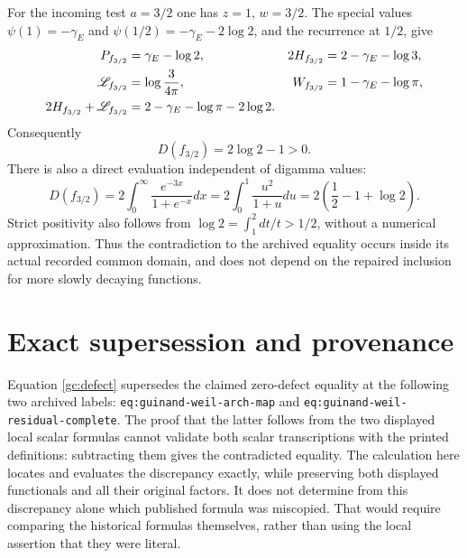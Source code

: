 \documentclass[11pt]{article}
\begin{document}
For the incoming test $a=3/2$ one has $z=1$, $w=3/2$.
The special values
$\psi(1)=-\gamma_E$ and $\psi(1/2)=-\gamma_E-2\log2$,
and the recurrence at $1/2$, give
\cite[5.4.12--13 and 5.5.2]{dlmf}
\begin{align}
 P_{f_{3/2}}&=\gamma_E-\log2,&
 2H_{f_{3/2}}&=2-\gamma_E-\log3,\notag\\
 \mathscr L_{f_{3/2}}&=\log\frac3{4\pi},&
 W_{f_{3/2}}&=1-\gamma_E-\log\pi,\notag\\
 2H_{f_{3/2}}+\mathscr L_{f_{3/2}}
   &=2-\gamma_E-\log\pi-2\log2.
 \label{gc:counterexample-values}
\end{align}
Consequently
\begin{equation}
 \boxed{D(f_{3/2})=2\log2-1>0.}
 \label{gc:counterexample}
\end{equation}
There is also a direct evaluation independent of digamma values:
\begin{equation}
 D(f_{3/2})=2\int_0^\infty\frac{e^{-3x}}{1+e^{-x}}dx
 =2\int_0^1\frac{u^2}{1+u}du
 =2\left(\frac12-1+\log2\right).
 \label{gc:direct-example}
\end{equation}
Strict positivity also follows from
$\log2=\int_1^2dt/t>1/2$, without a numerical approximation.
Thus the contradiction to the archived equality occurs inside its actual
recorded common domain, and does not depend on the repaired inclusion for
more slowly decaying functions.

\section{Exact supersession and provenance}

Equation \eqref{gc:defect} supersedes the claimed zero-defect equality at
the following two archived labels:
\texttt{eq:guinand-weil-arch-map} and
\texttt{eq:guinand-weil-residual-complete}.
The proof that the latter follows from the two displayed local scalar
formulas cannot validate both scalar transcriptions with the printed
definitions: subtracting them gives the contradicted equality.  The
calculation here locates and evaluates the discrepancy exactly, while
preserving both displayed functionals and all their original factors.
It does not determine from this discrepancy alone which published formula
was miscopied.  That would require comparing the historical formulas
themselves, rather than using the local assertion that they were literal.
\end{document}
